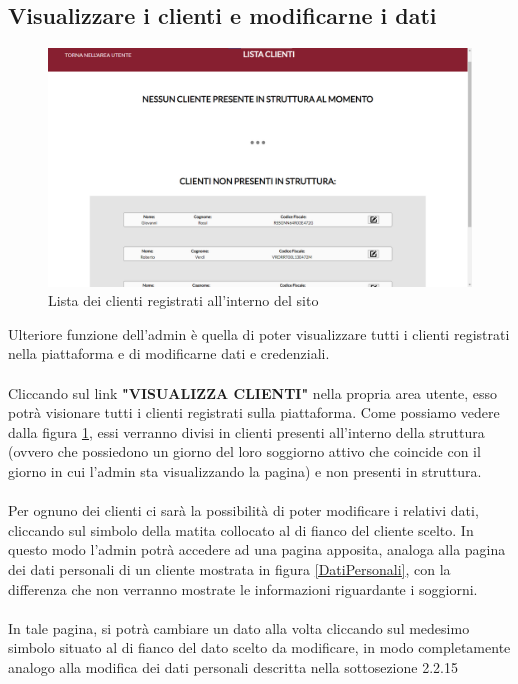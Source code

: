 \documentclass [a4paper, 12pt]{book}
\begin{document}
\subsection{Visualizzare i clienti e modificarne i dati}
\begin{figure}[h]
\centering
\includegraphics[scale=0.3]{ListaClienti.png}
\caption{Lista dei clienti registrati all'interno del sito}
\label{ListaClienti}
\end{figure}
Ulteriore funzione dell'admin è quella di poter visualizzare tutti i clienti registrati nella piattaforma e di modificarne dati e credenziali.\\\\
Cliccando sul link \textbf{"VISUALIZZA CLIENTI"} nella propria area utente, esso potrà visionare tutti i clienti registrati sulla piattaforma. Come possiamo vedere dalla figura \ref{ListaClienti}, essi verranno divisi in clienti presenti all'interno della struttura (ovvero che possiedono un giorno del loro soggiorno attivo che coincide con il giorno in cui l'admin sta visualizzando la pagina) e non presenti in struttura.\\\\
Per ognuno dei clienti ci sarà la possibilità di poter modificare i relativi dati, cliccando sul simbolo della matita collocato al di fianco del cliente scelto. In questo modo l'admin potrà accedere ad una pagina apposita, analoga alla pagina dei dati personali di un cliente mostrata in figura \ref{DatiPersonali}, con la differenza che non verranno mostrate le informazioni riguardante i soggiorni.\\\\ 
In tale pagina, si potrà cambiare un dato alla volta cliccando sul medesimo simbolo situato al di fianco del dato scelto da modificare, in modo completamente analogo alla modifica dei dati personali descritta nella sottosezione 2.2.15
\end{document}
